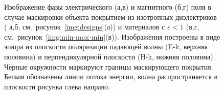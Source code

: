 \begin{figure}[p]
  \begin{minipage}[ht]{0.495\linewidth}
  \end{minipage}
  \hfill
  \begin{minipage}[ht]{0.495\linewidth}
  \end{minipage}
  \begin{minipage}[ht]{0.495\linewidth}
  \end{minipage}
  \hfill
  \begin{minipage}[ht]{0.495\linewidth}
  \end{minipage}

  \caption{Изображение фазы электрического (а,в) и магнитного (б,г)
    поля в случае маскировки объекта покрытием из изотропных
    диэлектриков ( а,б, см.~рисунок~\ref{img:designs}(а)) и материалов
    с ${\varepsilon <1}$ (в,г,
    см.~рисунок~\ref{img:min-max-min}(в)). Изображения построены в
    виде эпюра из плоскости поляризации падающей волны (E-k, верхняя
    половина) и перпендикулярной плоскости (H-k, нижняя половина). Чёрные
    окружности маркируют границы маскирующего покрытия. Белым
    обозначены линии потока энергии, волна распространяется в
    плоскости рисунка слева направо.}
  \label{img:field-phase}
\end{figure}

